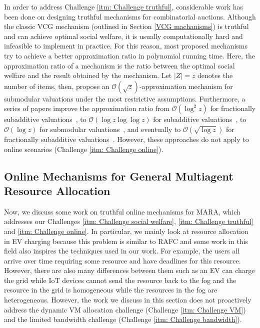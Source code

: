 \documentclass[11pt]{phdthesis}
\begin{document}
In order to address Challenge \ref{itm: Challenge truthful}, considerable work has been done on designing truthful mechanisms for combinatorial auctions. Although the classic VCG mechanism (outlined in Section \ref{VCG machanisms}) is truthful and can achieve optimal social welfare, it is usually computationally hard and infeasible to implement in practice. For this reason, most proposed mechanisms try to achieve a better approximation ratio in polynomial running time. Here, the approximation ratio of a mechanism is the ratio between the optimal social welfare and the result obtained by the mechanism. Let $ |Z| = z $ denotes the number of items, then, \citet{dobzinski2005approximation} propose an $\mathcal{O}(\sqrt{z})$-approximation mechanism for submodular valuations under the most restrictive assumptions. Furthermore, a series of papers improve the approximation ratio from $\mathcal{O}(\log^2{z})$ for fractionally subadditive valuations~\citep{dobzinski2006truthful}, to $\mathcal{O}(\log{z}\log{\log{z}})$ for subadditive valuations~\citep{dobzinski2007two}, to $ \mathcal{O}(\log{z}) $ for submodular valuations~\citep{krysta2012online}, and eventually to $ \mathcal{O}(\sqrt{\log{z}}) $ for fractionally subadditive valuations~\citep{dobzinski2016breaking}. However, these approaches do not apply to online scenarios (Challenge \ref{itm: Challenge online}).


\subsection{Online Mechanisms for General Multiagent Resource Allocation}

Now, we discuss some work on truthful online mechanisms for MARA, which addresses our Challenges \ref{itm: Challenge social welfare}, \ref{itm: Challenge truthful} and \ref{itm: Challenge online}. In particular, we mainly look at resource allocation in EV charging because this problem is similar to RAFC and some work in this field also inspires the techniques used in our work. For example, the users all arrive over time requiring some resource and have deadlines for this resource. However, there are also many differences between them such as an EV can charge the grid while IoT devices cannot send the resource back to the fog and the resource in the grid is homogeneous while the resources in the fog are heterogeneous. However, the work we discuss in this section does not proactively address the dynamic VM allocation challenge (Challenge \ref{itm: Challenge VM}) and the limited bandwidth challenge (Challenge \ref{itm: Challenge bandwidth}). 
\end{document}
